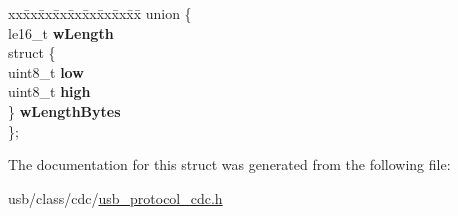 \begin{DoxyCompactItemize}
\begin{tabbing}
\end{tabbing}\item 
\mbox{\label{structusb__cdc__notify__msg_a55187e00b1d8baed5b85875321e69d29}} 
\begin{tabbing}
xx\=xx\=xx\=xx\=xx\=xx\=xx\=xx\=xx\=\kill
union \{\\
\>le16\_t {\bfseries wLength}\\
\>struct \{\\
\>\>uint8\_t {\bfseries low}\\
\>\>uint8\_t {\bfseries high}\\
\>\} {\bfseries wLengthBytes}\\
\}; \\

\end{tabbing}\end{DoxyCompactItemize}


The documentation for this struct was generated from the following file\+:\begin{DoxyCompactItemize}
\item 
usb/class/cdc/\hyperlink{usb__protocol__cdc_8h}{usb\+\_\+protocol\+\_\+cdc.\+h}\end{DoxyCompactItemize}
